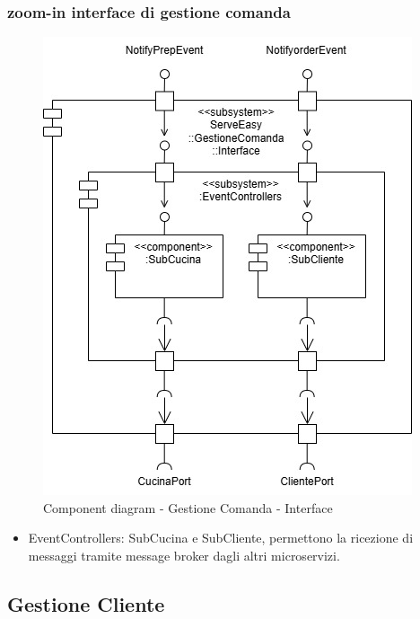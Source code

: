 \subsubsection{zoom-in interface di gestione comanda}
\begin{figure}[H]
	\centering
	\includegraphics[scale=0.5]{iterazione1/images/component_comanda_cucina-GestioneComanda__Interface.jpg}
	\caption{Component diagram - Gestione Comanda - Interface \label{fig:component_diagram_gestione_comanda_interface}}
\end{figure}
\begin{itemize}
    \item EventControllers: SubCucina e SubCliente, permettono la ricezione di messaggi tramite message broker dagli altri microservizi.
\end{itemize}

\subsection{Gestione Cliente}
